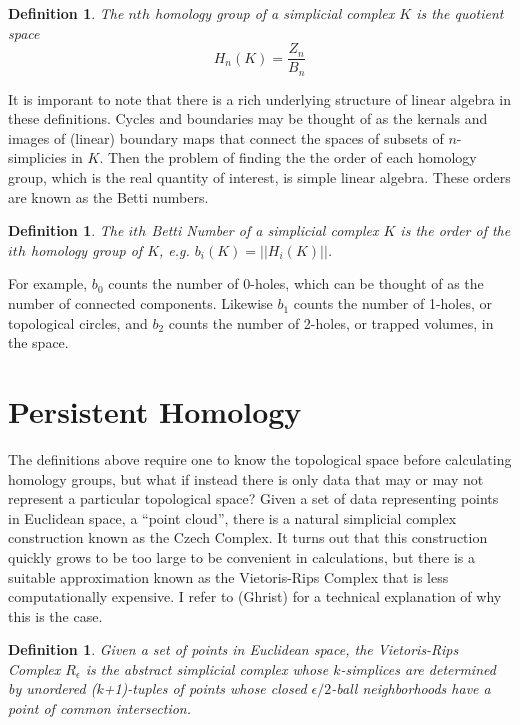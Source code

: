 \documentclass[11pt]{amsart}
\newtheorem{defn} [equation]{Definition}
\theoremstyle{remark}	  \newtheorem*{remark}{Remark}
\numberwithin{equation}{section}
\begin{document}
\begin{defn}\cite{Crossley}
  The $nth$ \emph{homology group} of a simplicial complex $K$ is the quotient space 
  \[ H_n(K) = \frac{Z_n}{B_n} \]
\end{defn}

It is imporant to  note that there is a rich underlying structure of linear algebra in these definitions. Cycles and boundaries may be thought of as the kernals and images of (linear) boundary maps that connect the spaces of subsets of $n$-simplicies in $K$. Then the problem of finding the the order of each homology group, which is the real quantity of interest, is simple linear algebra. These orders are known as the Betti numbers. 
 
\begin{defn}  The $ith$ \emph{Betti Number} of a simplicial complex $K$ is the order of the $ith$ homology group of $K$, e.g. $b_i(K) = ||H_i(K)||$.  
\end{defn}

For example, $b_0$ counts the number of 0-holes, which can be thought of as the number of connected components. Likewise $b_1$ counts the number of 1-holes, or topological circles, and $b_2$ counts the number of 2-holes, or trapped volumes, in the space.

\section{Persistent Homology}

The definitions above require one to know the topological space before calculating homology groups, but what if instead there is only data that may or may not represent a particular topological space? Given a set of data representing points in Euclidean space, a ``point cloud'', there is a natural simplicial complex construction known as the Czech Complex. It turns out that this construction quickly grows to be too large to be convenient in calculations, but there is a suitable approximation known as the Vietoris-Rips Complex that is less computationally expensive. I refer to (Ghrist) for a technical  explanation of why this is the case. 

\begin{defn} \cite{ghrist}  Given a set of points in Euclidean space, the  \emph{Vietoris-Rips Complex} $R_\epsilon$ is the abstract simplicial complex whose $k$-simplices are determined by unordered ($k$+1)-tuples of points whose closed $\epsilon/2$-ball neighborhoods have a point of common intersection. 
\end{defn}
\end{document}
